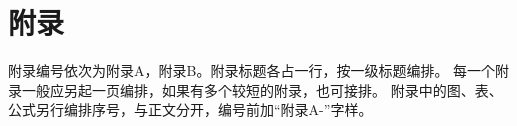 \chapter{附录}

附录编号依次为附录A，附录B。附录标题各占一行，按一级标题编排。
每一个附录一般应另起一页编排，如果有多个较短的附录，也可接排。
附录中的图、表、公式另行编排序号，与正文分开，编号前加“附录A-”字样。
